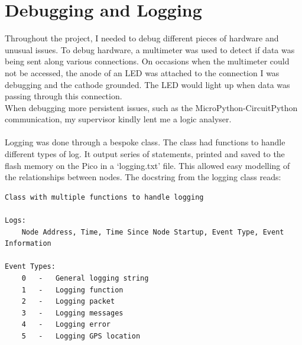 \documentclass[12pt,a4paper]{report}
\begin{document}
\section{Debugging and Logging}
Throughout the project, I needed to debug different pieces of hardware and unusual issues. To debug hardware, a multimeter was used to detect if data was being sent along various connections. On occasions when the multimeter could not be accessed, the anode of an LED was attached to the connection I was debugging and the cathode grounded. The LED would light up when data was passing through this connection. \\
When debugging more persistent issues, such as the MicroPython-CircuitPython communication, my supervisor kindly lent me a logic analyser. \\ \\ 
Logging was done through a bespoke class. The class had functions to handle different types of log. It output series of statements, printed and saved to the flash memory on the Pico in a `logging.txt' file. This allowed easy modelling of the relationships between nodes. The docstring from the logging class reads:\begin{verbatim}
Class with multiple functions to handle logging
    
Logs: 
    Node Address, Time, Time Since Node Startup, Event Type, Event Information

Event Types:
    0   -   General logging string
    1   -   Logging function
    2   -   Logging packet
    3   -   Logging messages
    4   -   Logging error
    5   -   Logging GPS location
    
\end{verbatim}
\end{document}
